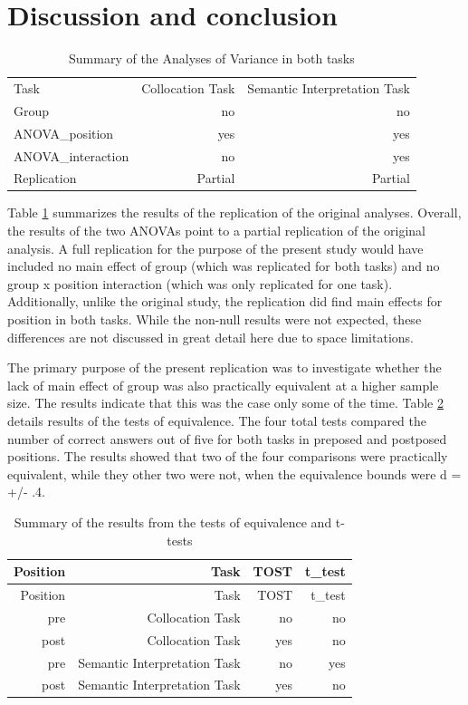 \documentclass[
  man,floatsintext]{apa6}
\begin{document}
\hypertarget{discussion-and-conclusion}{%
\section{Discussion and conclusion}\label{discussion-and-conclusion}}

\begin{longtable}[]{@{}lrr@{}}
\caption{\label{tab:summaryanovas}Summary of the Analyses of Variance in both tasks}\tabularnewline
\toprule\noalign{}
\endfirsthead
\endhead
\bottomrule\noalign{}
\endlastfoot
Task & Collocation Task & Semantic Interpretation Task \\
Group & no & no \\
ANOVA\_position & yes & yes \\
ANOVA\_interaction & no & yes \\
Replication & Partial & Partial \\
\end{longtable}

Table \ref{tab:summaryanovas} summarizes the results of the replication of the original analyses.
Overall, the results of the two ANOVAs point to a partial replication of the original analysis.
A full replication for the purpose of the present study would have included no main effect of group (which was replicated for both tasks) and no group x position interaction (which was only replicated for one task).
Additionally, unlike the original study, the replication did find main effects for position in both tasks.
While the non-null results were not expected, these differences are not discussed in great detail here due to space limitations.

The primary purpose of the present replication was to investigate whether the lack of main effect of group was also practically equivalent at a higher sample size.
The results indicate that this was the case only some of the time.
Table \ref{tab:summaryttests} details results of the tests of equivalence.
The four total tests compared the number of correct answers out of five for both tasks in preposed and postposed positions.
The results showed that two of the four comparisons were practically equivalent, while they other two were not, when the equivalence bounds were d = +/- .4.

\begin{longtable}[]{@{}rrrr@{}}
\caption{\label{tab:summaryttests}Summary of the results from the tests of equivalence and t-tests}\tabularnewline
\toprule\noalign{}
Position & Task & TOST & t\_test \\
\midrule\noalign{}
\endfirsthead
\toprule\noalign{}
Position & Task & TOST & t\_test \\
\midrule\noalign{}
\endhead
\bottomrule\noalign{}
\endlastfoot
pre & Collocation Task & no & no \\
post & Collocation Task & yes & no \\
pre & Semantic Interpretation Task & no & yes \\
post & Semantic Interpretation Task & yes & no \\
\end{longtable}
\end{document}
